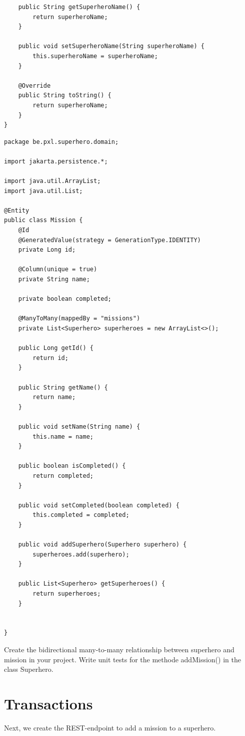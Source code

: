 \begin{itemize}
\begin{lstlisting}
	public String getSuperheroName() {
		return superheroName;
	}

	public void setSuperheroName(String superheroName) {
		this.superheroName = superheroName;
	}

	@Override
	public String toString() {
		return superheroName;
	}
}
\end{lstlisting}

\begin{lstlisting}
package be.pxl.superhero.domain;

import jakarta.persistence.*;

import java.util.ArrayList;
import java.util.List;

@Entity
public class Mission {
	@Id
	@GeneratedValue(strategy = GenerationType.IDENTITY)
	private Long id;

	@Column(unique = true)
	private String name;

	private boolean completed;

	@ManyToMany(mappedBy = "missions")
	private List<Superhero> superheroes = new ArrayList<>();

	public Long getId() {
		return id;
	}

	public String getName() {
		return name;
	}

	public void setName(String name) {
		this.name = name;
	}

	public boolean isCompleted() {
		return completed;
	}

	public void setCompleted(boolean completed) {
		this.completed = completed;
	}

	public void addSuperhero(Superhero superhero) {
		superheroes.add(superhero);
	}

	public List<Superhero> getSuperheroes() {
		return superheroes;
	}


}
\end{lstlisting}


\begin{oefening}
Create the bidirectional many-to-many relationship between superhero and mission in your project. 
Write unit tests for the methode addMission() in the class Superhero.
\end{oefening}

\section{Transactions}

Next, we create the REST-endpoint to add a mission to a superhero.


\end{itemize}
